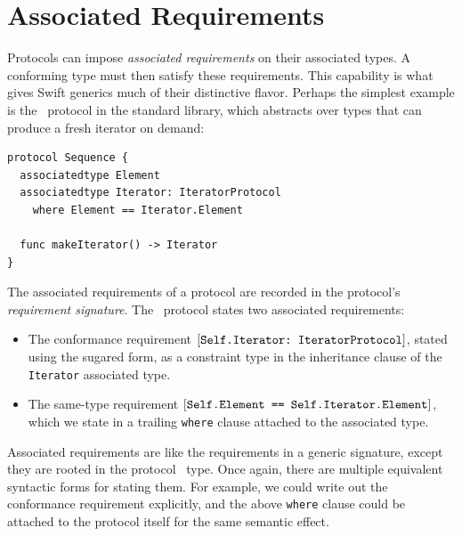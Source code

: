 \documentclass[../generics]{subfiles}
\begin{document}
\section{Associated Requirements}

Protocols can impose \emph{associated requirements} on their associated types. A conforming type must then satisfy these requirements. This capability is what gives Swift generics much of their distinctive flavor. Perhaps the simplest example is the \tSequence\ protocol in the standard library, which abstracts over types that can produce a fresh iterator on demand:
\begin{Verbatim}
protocol Sequence {
  associatedtype Element
  associatedtype Iterator: IteratorProtocol
    where Element == Iterator.Element

  func makeIterator() -> Iterator
}
\end{Verbatim}
The associated requirements of a protocol are recorded in the protocol's \emph{requirement signature}. The \tSequence\ protocol states two associated requirements:
\begin{itemize}
\item The conformance requirement $[\texttt{Self.Iterator:~IteratorProtocol}]$, stated using the sugared form, as a constraint type in the inheritance clause of the \texttt{Iterator} associated type.
\item The same-type requirement $[\texttt{Self.Element == Self.Iterator.Element}]$, which we state in a trailing \texttt{where} clause attached to the associated type.
\end{itemize}
Associated requirements are like the requirements in a generic signature, except they are rooted in the \IndexSelf protocol \tSelf\ type. Once again, there are multiple equivalent syntactic forms for stating them. For example, we could write out the conformance requirement explicitly, and the above \texttt{where} clause could be attached to the protocol itself for the same semantic effect.
\end{document}
